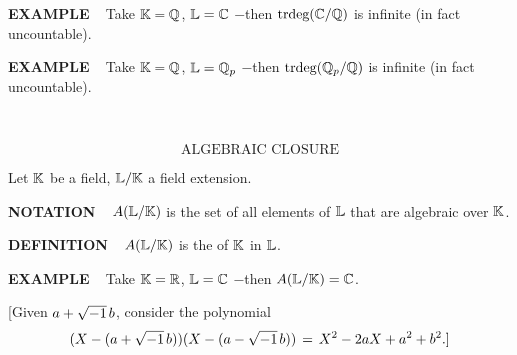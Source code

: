 \begin{x}{\small\bf EXAMPLE} \ %
Take $\mathbb{K} = \mathbb{Q}$, $\mathbb{L} = \mathbb{C}$ $-$then $\text{trdeg}(\mathbb{C}/\mathbb{Q})$ is infinite (in fact uncountable).
\end{x}

\vspace{0.1cm}

\begin{x}{\small\bf EXAMPLE} \ %
Take $\mathbb{K} = \mathbb{Q}$, $\mathbb{L} = \mathbb{Q}_p$ $-$then $\text{trdeg}(\mathbb{Q}_p/\mathbb{Q})$ is infinite (in fact uncountable).
\end{x}

\vspace{0.1cm}





\setcounter{theoremn}{0}

\newpage

\ \indent 

\[
\text{ALGEBRAIC CLOSURE}
\]

Let $\mathbb{K}$ be a field, $\mathbb{L}/\mathbb{K}$ a field extension.

\vspace{0.2cm}

\begin{x}{\small\bf NOTATION} \ %
$A(\mathbb{L}/\mathbb{K})$ is the set of all elements of $\mathbb{L}$ that are algebraic over $\mathbb{K}$.
\end{x}

\vspace{0.1cm}


\begin{x}{\small\bf DEFINITION} \ %
$A(\mathbb{L}/\mathbb{K})$ is the 
of $\mathbb{K}$ in $\mathbb{L}$.
\end{x}

\vspace{0.1cm}

\begin{x}{\small\bf EXAMPLE} \ %
Take $\mathbb{K} = \mathbb{R}$, $\mathbb{L} = \mathbb{C}$ $-$then $A(\mathbb{L}/\mathbb{K}) = \mathbb{C}$.

\vspace{0.1cm}

[Given $a + \sqrt{-1} \hspace{0.05cm} b$, consider the polynomial
\[
(X - (a + \sqrt{-1} \hspace{0.05cm} b)) (X - (a - \sqrt{-1} \hspace{0.05cm} b)) \hspace{0.05cm} = \hspace{0.05cm} 
X^2 - 2 a X + a^2 + b^2.]
\]
\end{x}

